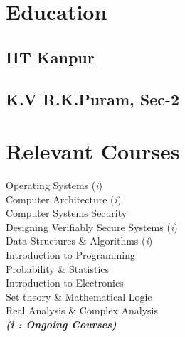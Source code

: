 \documentclass[]{deedy-resume-openfont}
\begin{document}
\begin{minipage}[t]{0.30\textwidth} 

\vspace{-0.5cm}
\section{Education} 

\subsection{IIT Kanpur}
\sectionsep{}

\subsection{K.V R.K.Puram, Sec-2}
\sectionsep{}
%


\section{Relevant Courses}
Operating Systems (\textit{i}) \\
Computer Architecture (\textit{i}) \\
Computer Systems Security \\
Designing Verifiably Secure Systems (\textit{i}) \\
Data Structures \& Algorithms (\textit{i}) \\
Introduction to Programming \\
Probability \& Statistics \\
Introduction to Electronics \\
Set theory \& Mathematical Logic \\
Real Analysis \& Complex Analysis\\


{\footnotesize \textit{\textbf{ (i : Ongoing Courses)}}}


\end{minipage}
\end{document}

